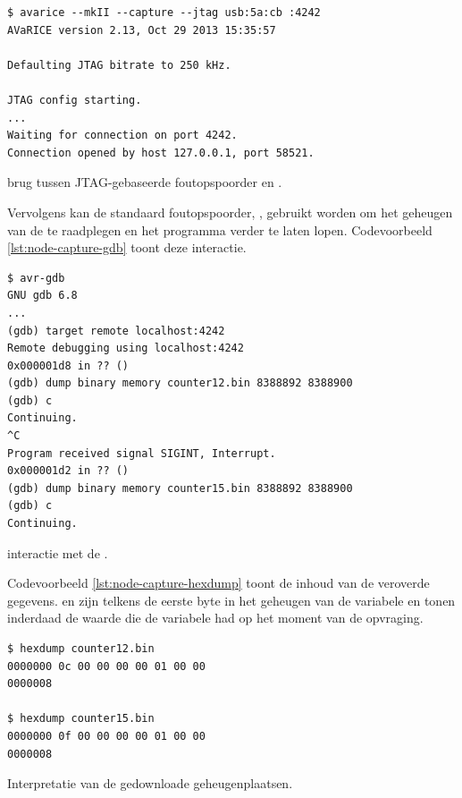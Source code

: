 \begin{listing}[ht]
  \begin{verbatim}
$ avarice --mkII --capture --jtag usb:5a:cb :4242
AVaRICE version 2.13, Oct 29 2013 15:35:57

Defaulting JTAG bitrate to 250 kHz.

JTAG config starting.
...
Waiting for connection on port 4242.
Connection opened by host 127.0.0.1, port 58521.
  \end{verbatim}
  \vspace{-5mm}
  \caption{ brug tussen JTAG-gebaseerde foutopspoorder en .}
  \label{lst:node-capture-avarice}
\end{listing}

Vervolgens kan de standaard foutopspoorder, , gebruikt worden om het
geheugen van de \mcu te raadplegen en het programma verder te laten lopen.
Codevoorbeeld \ref{lst:node-capture-gdb} toont deze interactie.

\begin{listing}[ht]
  \begin{verbatim}
$ avr-gdb
GNU gdb 6.8
...
(gdb) target remote localhost:4242
Remote debugging using localhost:4242
0x000001d8 in ?? ()
(gdb) dump binary memory counter12.bin 8388892 8388900
(gdb) c
Continuing.
^C
Program received signal SIGINT, Interrupt.
0x000001d2 in ?? ()
(gdb) dump binary memory counter15.bin 8388892 8388900
(gdb) c
Continuing.
  \end{verbatim}
  \vspace{-5mm}
  \caption{ interactie met de \mcu.}
  \label{lst:node-capture-gdb}
\end{listing}

Codevoorbeeld \ref{lst:node-capture-hexdump} toont de inhoud van de veroverde
gegevens.  en  zijn telkens de eerste byte in het geheugen van
de  variabele en tonen inderdaad de waarde die de variabele had op
het moment van de opvraging.

\begin{listing}[ht]
  \begin{verbatim}
$ hexdump counter12.bin 
0000000 0c 00 00 00 00 01 00 00                        
0000008

$ hexdump counter15.bin 
0000000 0f 00 00 00 00 01 00 00                        
0000008
  \end{verbatim}
  \vspace{-5mm}
  \caption{Interpretatie van de gedownloade geheugenplaatsen.}
  \label{lst:node-capture-hexdump}
\end{listing}

